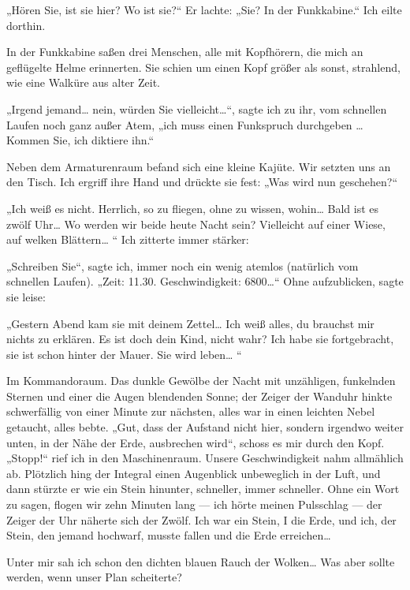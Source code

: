 „Hören Sie, ist sie hier? Wo ist sie?“ Er lachte: „Sie? In der
Funkkabine.“ Ich eilte dorthin.

In der Funkkabine saßen drei Menschen, alle mit Kopfhörern, die
mich an geflügelte Helme erinnerten. Sie schien um einen Kopf
größer als sonst, strahlend, wie eine Walküre aus alter Zeit.

„Irgend jemand\ldots{} nein, würden Sie vielleicht\ldots{}“, sagte ich zu
ihr, vom schnellen Laufen noch ganz außer Atem, „ich muss einen
Funkspruch durchgeben \ldots{} Kommen Sie, ich diktiere ihn.“

Neben dem Armaturenraum befand sich eine kleine Kajüte. Wir setzten
uns an den Tisch. Ich ergriff ihre Hand und drückte sie fest: „Was
wird nun geschehen?“

„Ich weiß es nicht. Herrlich, so zu fliegen, ohne zu wissen,
wohin\ldots{} Bald ist es zwölf Uhr\ldots{} Wo werden wir beide heute Nacht
sein? Vielleicht auf einer Wiese, auf welken Blättern\ldots{} “ Ich
zitterte immer stärker:

„Schreiben Sie“, sagte ich, immer noch ein wenig atemlos (natürlich
vom schnellen Laufen). „Zeit: 11.30. Geschwindigkeit: 6800\ldots{}“
Ohne aufzublicken, sagte sie leise:

„Gestern Abend kam sie mit deinem Zettel\ldots{} Ich weiß alles, du
brauchst mir nichts zu erklären. Es ist doch dein Kind, nicht wahr?
Ich habe sie fortgebracht, sie ist schon hinter der Mauer. Sie wird
leben\ldots{} “

Im Kommandoraum. Das dunkle Gewölbe der Nacht mit unzähligen,
funkelnden Sternen und einer die Augen blendenden Sonne; der Zeiger
der Wanduhr hinkte schwerfällig von einer Minute zur nächsten,
alles war in einen leichten Nebel getaucht, alles bebte. „Gut, dass
der Aufstand nicht hier, sondern irgendwo weiter unten, in der Nähe
der Erde, ausbrechen wird“, schoss es mir durch den Kopf. „Stopp!“
rief ich in den Maschinenraum. Unsere Geschwindigkeit nahm
allmählich ab. Plötzlich hing der Integral einen Augenblick
unbeweglich in der Luft, und dann stürzte er wie ein Stein
hinunter, schneller, immer schneller. Ohne ein Wort zu sagen,
flogen wir zehn Minuten lang — ich hörte meinen Pulsschlag — der
Zeiger der Uhr näherte sich der Zwölf. Ich war ein Stein, I die
Erde, und ich, der Stein, den jemand hochwarf, musste fallen und
die Erde erreichen\ldots{}

Unter mir sah ich schon den dichten blauen Rauch der Wolken\ldots{} Was
aber sollte werden, wenn unser Plan scheiterte?

